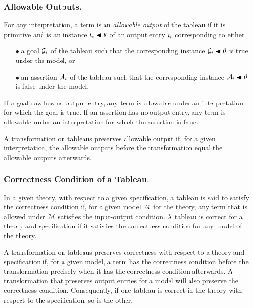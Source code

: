 \documentclass[runningheads]{llncs}
\begin{document}
\subsubsection{Allowable Outputs.} For any interpretation, a  term is an \emph{allowable output} of the tableau if it is primitive and is an instance  ${t}_{i}\blacktriangleleft \theta$ of an output entry  ${t}_{i}$ corresponding to either 

\begin{itemize}
\item[$\bullet$] a goal ${\mathcal{G}}_{i}$ of the tableau such that the corresponding instance ${\mathcal{G}}_{i}\blacktriangleleft \theta$ is true under the model, or
\item[$\bullet$] an assertion ${\mathcal{A}}_{i}$ of the tableau such that the corresponding instance ${\mathcal{A}}_{i}\blacktriangleleft \theta$ is false under the model.

\end{itemize}
If a goal row has no output entry, any term is allowable under an interpretation for which the goal is true.  If an assertion has no output entry, any term is allowable under an interpretation for which the assertion is false.

A transformation on tableaus preserves allowable output if, for a given interpretation, the allowable outputs before the transformation equal the allowable outputs afterwards.

\subsubsection{Correctness Condition of a Tableau.} In a given theory, with respect to a given specification, a tableau is said to satisfy the correctness condition if, for a given model $\mathcal{M}$ for the theory, any term that is allowed under $\mathcal{M}$ satisfies the input-output condition. A tableau is correct for a theory and specification if it satisfies the correctness condition for any model of the theory.

A transformation on tableaus preserves correctness with respect to a theory and specification if, for a given model, a term has the correctness condition before the transformation precisely when it has the correctness condition afterwards.  A transformation that preserves output entries for a model will also preserve the correctness condition. Consequently, if one tableau is correct in the theory with respect to the specification, so is the other.
\end{document}
